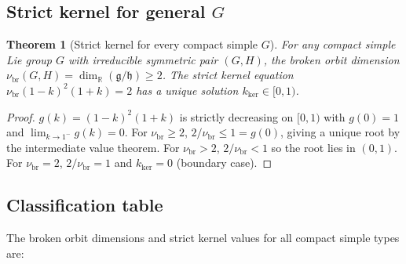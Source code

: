 \documentclass[12pt]{article}
\theoremstyle{plain}
\newtheorem{theorem}{Theorem}[section]
\theoremstyle{definition}
\numberwithin{equation}{section}
\newcommand{\R}{\mathbb{R}}
\newcommand{\fg}{\mathfrak{g}}
\newcommand{\fh}{\mathfrak{h}}
\newcommand{\br}{\mathrm{br}}
\newcommand{\kker}{\mathrm{ker}}
\begin{document}
\subsection{Strict kernel for general $G$}

\begin{theorem}[Strict kernel for every compact simple $G$]\label{thm:generalkernel}
For any compact simple Lie group $G$ with irreducible symmetric pair $(G,H)$, the broken orbit dimension $\nu_{\br}(G,H)=\dim_\R(\fg/\fh)\geq 2$.  The strict kernel equation $\nu_{\br}(1-k)^2(1+k)=2$ has a unique solution $k_{\kker}\in[0,1)$.
\end{theorem}

\begin{proof}
$g(k)=(1-k)^2(1+k)$ is strictly decreasing on $[0,1)$ with $g(0)=1$ and $\lim_{k\to 1^-}g(k)=0$.  For $\nu_{\br}\geq 2$, $2/\nu_{\br}\leq 1=g(0)$, giving a unique root by the intermediate value theorem.  For $\nu_{\br}>2$, $2/\nu_{\br}<1$ so the root lies in $(0,1)$.  For $\nu_{\br}=2$, $2/\nu_{\br}=1$ and $k_{\kker}=0$ (boundary case).
\end{proof}

\subsection{Classification table}

The broken orbit dimensions and strict kernel values for all compact simple types are:
\end{document}

